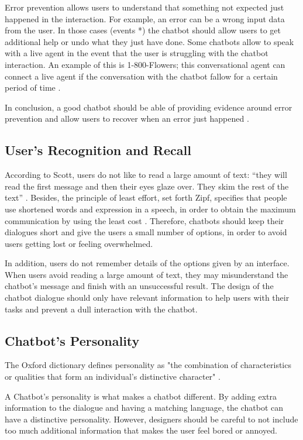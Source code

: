 \documentclass[a4paper,10pt]{article}
\begin{document}
Error prevention allows users to understand that something not expected just happened in the interaction. For example, an error can be a wrong input data from the user. In those cases (events *) the chatbot should allow users to get additional help or undo what they just have done. Some chatbots  allow to speak with a live agent in the event that the user is struggling with the chatbot interaction. An example of this is 1-800-Flowers; this conversational agent can connect a live agent if the conversation with the chatbot fallow for a certain period of time \cite{1-800-Flowers}. 

In conclusion, a good chatbot should be able of providing evidence around error prevention and allow users to recover when an error just happened \cite{HeuristicsWebPage}. 

\subsection*{User's Recognition and Recall}

According to Scott, users do not like to read a large amount of text: ``they will read the first message and then their eyes glaze over. They skim the rest of the text” \cite{HeuristicsWebPage}. Besides, the principle of least effort, set forth Zipf, specifies that people use shortened words and expression in a speech, in order to obtain the maximum communication by using the least cost \cite{allen1978conversation}. Therefore, chatbots should keep their dialogues short and give the users a small number of options, in order to avoid users getting lost or feeling overwhelmed.

In addition, users do not remember details of the options given by an interface. When users avoid reading a large amount of text, they may misunderstand the chatbot’s message and finish with an unsuccessful result. The design of the chatbot dialogue should only have relevant information to help users with their tasks and prevent a dull interaction with the chatbot. 

\subsection*{Chatbot's Personality}

The Oxford dictionary defines personality as "the combination of characteristics or qualities that form an individual's distinctive character" \cite{Oxford}.

A Chatbot’s personality is what makes a chatbot different. By adding extra information to the dialogue and having a matching language, the chatbot can have a distinctive personality. However, designers should be careful to not include too much additional information that makes the user feel bored or annoyed. 
\end{document}
